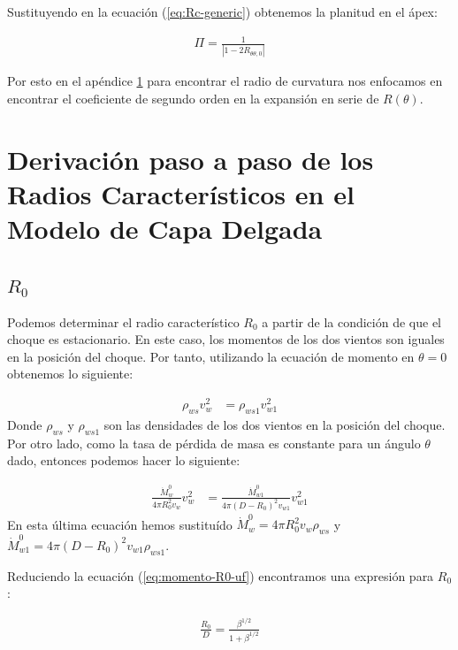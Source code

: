 Sustituyendo en la ecuación (\ref{eq:Rc-generic}) obtenemos la planitud en el ápex:

\begin{align}
  \Pi = \frac{1}{\left|1 - 2R_{\theta \theta, 0}\right|}\label{eq:Rc-nose}
\end{align}

Por esto en el apéndice \ref{app:derivation-radii} para encontrar el radio de curvatura nos enfocamos en encontrar
el coeficiente de segundo orden en la expansión en serie de $R(\theta)$.

\chapter[Derivación de Radios Característicos]{Derivación paso a paso de los Radios Característicos en el Modelo de Capa Delgada}
\label{app:derivation-radii}
\thispagestyle{empty}
\section{$R_0$}
Podemos determinar el radio característico $R_0$ a partir de la condición de que el choque es estacionario. En este caso,
los momentos de los dos vientos son iguales en la posición del choque. Por tanto, utilizando la ecuación de momento en $\theta=0$
obtenemos lo siguiente:

\begin{align}
  \rho_{ws} v^2_w &= \rho_{ws1} v^2_{w1}
\end{align}
Donde $\rho_{ws}$ y $\rho_{ws1}$ son las densidades de los dos vientos en la posición del choque. Por otro lado, como la tasa de pérdida
de masa es constante para un ángulo $\theta$ dado, entonces podemos hacer lo siguiente:

\begin{align}
  \frac{\dot{M}^0_w}{4\pi R_0^2 v_w}v^2_w &= \frac{\dot{M}^0_{w1}}{4\pi\left(D-R_0\right)^2v_{w1}}v^2_{w1} \label{eq:momento-R0-uf}
\end{align}
En esta última ecuación hemos sustituído $\dot{M}^0_w = 4\pi R_0^2 v_w \rho_{ws}$ y \\
$\dot{M}^0_{w1} = 4\pi \left(D - R_0\right)^2 v_{w1} \rho_{ws1}$.

Reduciendo la ecuación (\ref{eq:momento-R0-uf}) encontramos una expresión para $R_0$:

\begin{align}
  \frac{R_0}{D} = \frac{\beta^{1/2}}{1+\beta^{1/2}}
\end{align}

